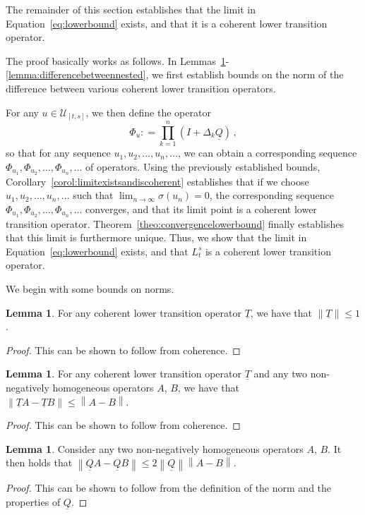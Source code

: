 \documentclass[10pt]{paper}
\theoremstyle{definition}
\newtheorem{lemma}[theorem]{Lemma}
\newcommand{\lt}{\underline{T}}
\newcommand{\lrate}{\underline{Q}}
\newcommand{\norm}[1]{\left\lVert #1 \right\rVert}
\newcommand{\coloneqq}{:\!=}
\begin{document}
\noindent The remainder of this section establishes that the limit in Equation~\eqref{eq:lowerbound} exists, and that it is a coherent lower transition operator.

The proof basically works as follows. In Lemmas~\ref{lemma:normofcoherenttrans}-\ref{lemma:differencebetweennested}, we first establish bounds on the norm of the difference between various coherent lower transition operators.

For any $u\in\mathcal{U}_{[t,s]}$, we then define the operator
\begin{equation*}
\Phi_u\coloneqq\prod_{k=1}^n(I+\Delta_k\lrate)\,,
\end{equation*}
so that for any sequence $u_1,u_2,\ldots,u_n,\ldots$, we can obtain a corresponding sequence $\Phi_{u_1},\Phi_{u_2},\ldots,\Phi_{u_n},\ldots$ of operators. Using the previously established bounds, Corollary~\ref{corol:limitexistsandiscoherent} establishes that if we choose $u_1,u_2,\ldots,u_n,\ldots$ such that $\lim_{n\rightarrow\infty}\sigma(u_n)=0$, the corresponding sequence $\Phi_{u_1},\Phi_{u_2},\ldots,\Phi_{u_n},\ldots$ converges, and that its limit point is a coherent lower transition operator. Theorem~\ref{theo:convergencelowerbound} finally establishes that this limit is furthermore unique. Thus, we show that the limit in Equation~\eqref{eq:lowerbound} exists, and that $L_t^s$ is a coherent lower transition operator. 

We begin with some bounds on norms.

\begin{lemma}\label{lemma:normofcoherenttrans}
For any coherent lower transition operator $\lt$, we have that $\norm{\lt}\leq 1$.
\end{lemma}
\begin{proof}
This can be shown to follow from coherence.
\end{proof}

\begin{lemma}\label{lemma:differencenormofcoherenttrans}
For any coherent lower transition operator $\lt$ and any two non-negatively homogeneous operators $A$, $B$, we have that $\norm{\lt A-\lt B}\leq \norm{A-B}$.
\end{lemma}
\begin{proof}
This can be shown to follow from coherence.
\end{proof}

\begin{lemma}\label{lemma:differencenormofcoherenttransrate}
Consider any two non-negatively homogeneous operators $A$, $B$. It then holds that $\norm{\lrate A-\lrate B}\leq 2\norm{\lrate}\norm{A-B}$.
\end{lemma}
\begin{proof}
This can be shown to follow from the definition of the norm and the properties of $\lrate$.
\end{proof}
\end{document}
